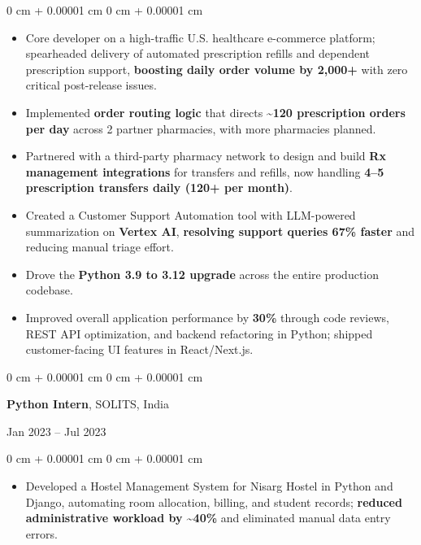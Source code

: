 \documentclass[10pt, letterpaper]{article}
\newenvironment{highlights}{
    \begin{itemize}[
        topsep=0.06 cm,
        parsep=0.06 cm,
        partopsep=0pt,
        itemsep=0pt,
        leftmargin=0 cm + 10pt
    ]
}{
    \end{itemize}
} %
\newenvironment{onecolentry}{
    \begin{adjustwidth}{
        0 cm + 0.00001 cm
    }{
        0 cm + 0.00001 cm
    }
}{
    \end{adjustwidth}
} %
\newenvironment{twocolentry}[2][]{
    \onecolentry
    \def\secondColumn{#2}
}{
    \unskip\hfill\secondColumn
    \endonecolentry
} %
\begin{document}
        \vspace{0.06 cm}
        \begin{onecolentry}
            \begin{highlights}
                \item Core developer on a high-traffic U.S. healthcare e-commerce platform; spearheaded delivery of automated prescription refills and dependent prescription support, \textbf{boosting daily order volume by 2,000+} with zero critical post-release issues.
                \item Implemented \textbf{order routing logic} that directs \textbf{\textasciitilde120 prescription orders per day} across 2 partner pharmacies, with more pharmacies planned.
                \item Partnered with a third-party pharmacy network to design and build \textbf{Rx management integrations} for transfers and refills, now handling \textbf{4--5 prescription transfers daily (120+ per month)}.
                \item Created a Customer Support Automation tool with LLM-powered summarization on \textbf{Vertex AI}, \textbf{resolving support queries 67\% faster} and reducing manual triage effort.
                \item Drove the \textbf{Python 3.9 to 3.12 upgrade} across the entire production codebase.
                \item Improved overall application performance by \textbf{30\%} through code reviews, REST API optimization, and backend refactoring in Python; shipped customer-facing UI features in React/Next.js.
            \end{highlights}
        \end{onecolentry}

        \vspace{0.15 cm}

        \begin{twocolentry}{Jan 2023 – Jul 2023}
            \textbf{Python Intern}, SOLITS, India
        \end{twocolentry}

        \vspace{0.06 cm}
        \begin{onecolentry}
            \begin{highlights}
                \item Developed a Hostel Management System for Nisarg Hostel in Python and Django, automating room allocation, billing, and student records; \textbf{reduced administrative workload by \textasciitilde40\%} and eliminated manual data entry errors.
            \end{highlights}
        \end{onecolentry}
\end{document}
